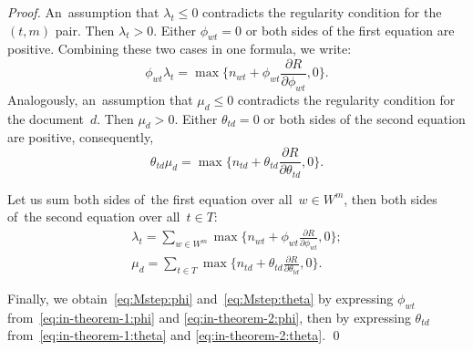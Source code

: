 \documentclass{acm_proc_article-sp}
\begin{document}
\begin{proof}
    An~assumption that $\lambda_t\leq 0$ contradicts the regularity condition for the $(t,m)$ pair.
    Then ${\lambda_t>0}$.
    Either ${\phi_{wt}= 0}$ or both sides of the first equation are positive.
    Combining these two cases in one formula, we write:
    \begin{equation}
    \label{eq:in-theorem-1:phi}
        \phi_{wt} \lambda_t
        =
        \max\biggl\{
        n_{wt} + \phi_{wt} \frac{\partial R}{\partial \phi_{wt}}, 0
        \biggr\}.
    \end{equation}
    Analogously,
    an~assumption that $\mu_d\leq 0$ contradicts the regularity condition for the document~$d$.
    Then ${\mu_d>0}$.
    Either ${\theta_{td}= 0}$ or both sides of the second equation are positive,
    consequently,
    \begin{equation}
    \label{eq:in-theorem-1:theta}
        \theta_{td} \mu_d
        =
        \max\biggl\{
        n_{td} + \theta_{td} \frac{\partial R}{\partial \theta_{td}}, 0
        \biggr\}.
    \end{equation}

    Let us sum
    both sides of~the first equation over all~${w\in W^m}$,
    then
    both sides of~the second equation over all~${t\in T}$:
    \begin{gather}
    \label{eq:in-theorem-2:phi}
        \lambda_t
        =
        \sum_{w\in W^m}
        \max\biggl\{
        n_{wt} + \phi_{wt} \frac{\partial R}{\partial \phi_{wt}}, 0
        \biggr\};
    \\
    \label{eq:in-theorem-2:theta}
        \mu_d
        =
        \sum_{t\in T}
        \max\biggl\{
        n_{td} + \theta_{td} \frac{\partial R}{\partial \theta_{td}}, 0
        \biggr\}.
    \end{gather}

    Finally,
    we obtain~\eqref{eq:Mstep:phi} and~\eqref{eq:Mstep:theta}
    by expressing $\phi_{wt}$ from~\eqref{eq:in-theorem-1:phi} and \eqref{eq:in-theorem-2:phi},
    then
    by expressing $\theta_{td}$ from~\eqref{eq:in-theorem-1:theta} and \eqref{eq:in-theorem-2:theta}.
    \qed
\end{proof}
\end{document}
